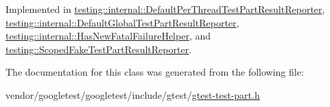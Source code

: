 Implemented in \hyperlink{classtesting_1_1internal_1_1DefaultPerThreadTestPartResultReporter_ac6dc08eadc4e5a2a64a91d0b6c6b3aad}{testing\+::internal\+::\+Default\+Per\+Thread\+Test\+Part\+Result\+Reporter}, \hyperlink{classtesting_1_1internal_1_1DefaultGlobalTestPartResultReporter_a6081576a23b964cfecab1e424d8044fc}{testing\+::internal\+::\+Default\+Global\+Test\+Part\+Result\+Reporter}, \hyperlink{classtesting_1_1internal_1_1HasNewFatalFailureHelper_a2d2e1faa1f3669b82810df97ac678a27}{testing\+::internal\+::\+Has\+New\+Fatal\+Failure\+Helper}, and \hyperlink{classtesting_1_1ScopedFakeTestPartResultReporter_a82531434f51632d98ed7cdcdb10b8b92}{testing\+::\+Scoped\+Fake\+Test\+Part\+Result\+Reporter}.



The documentation for this class was generated from the following file\+:\begin{DoxyCompactItemize}
\item 
vendor/googletest/googletest/include/gtest/\hyperlink{gtest-test-part_8h}{gtest-\/test-\/part.\+h}\end{DoxyCompactItemize}
